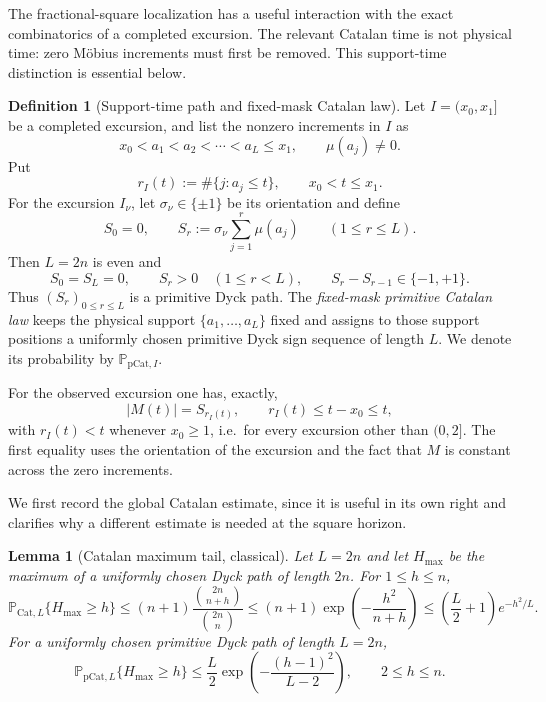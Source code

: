 \documentclass[11pt,reqno]{amsart}
\numberwithin{equation}{section}
\theoremstyle{plain}
\newtheorem{lemma}[theorem]{Lemma}
\theoremstyle{definition}
\newtheorem{definition}[theorem]{Definition}
\theoremstyle{remark}
\begin{document}
The fractional-square localization has a useful interaction with the exact
combinatorics of a completed excursion.  The relevant Catalan time is not
physical time: zero M\"obius increments must first be removed.  This
support-time distinction is essential below.

\begin{definition}[Support-time path and fixed-mask Catalan law]
\label{def:support-catalan}
Let $I=(x_0,x_1]$ be a completed excursion, and list the nonzero increments in
$I$ as
\begin{equation}
 x_0<a_1<a_2<\cdots<a_L\le x_1,
 \qquad \mu(a_j)\ne0.
\end{equation}
Put
\begin{equation}
 r_I(t):=\#\{j:a_j\le t\},\qquad x_0<t\le x_1.
\end{equation}
For the excursion $I_\nu$, let $\sigma_\nu\in\{\pm1\}$ be its orientation and define
\begin{equation}
 S_0=0,\qquad
 S_r:=\sigma_\nu\sum_{j=1}^r\mu(a_j)\qquad(1\le r\le L).
\end{equation}
Then $L=2n$ is even and
\begin{equation}
 S_0=S_L=0,\qquad S_r>0\quad(1\le r<L),\qquad
 S_r-S_{r-1}\in\{-1,+1\}.
\end{equation}
Thus $(S_r)_{0\le r\le L}$ is a primitive Dyck path.  The
\emph{fixed-mask primitive Catalan law} keeps the physical support
$\{a_1,\dots,a_L\}$ fixed and assigns to those support positions a uniformly
chosen primitive Dyck sign sequence of length $L$.  We denote its probability
by $\mathbb P_{\mathrm{pCat},I}$.
\end{definition}

For the observed excursion one has, exactly,
\begin{equation}
\label{eq:support-time-height}
 |M(t)|=S_{r_I(t)},
 \qquad
 r_I(t)\le t-x_0\le t,
\end{equation}
with $r_I(t)<t$ whenever $x_0\ge1$, i.e.\ for every excursion other than $(0,2]$.
The first equality uses the orientation of the excursion and the fact that
$M$ is constant across the zero increments.

We first record the global Catalan estimate, since it is useful in its own
right and clarifies why a different estimate is needed at the square
horizon.

\begin{lemma}[Catalan maximum tail, classical]
\label{lem:catalan-max-tail}
Let $L=2n$ and let $H_{\max}$ be the maximum of a uniformly chosen Dyck path
of length $2n$.  For $1\le h\le n$,
\begin{equation}
\label{eq:catalan-max-tail}
 \mathbb P_{\mathrm{Cat},L}\{H_{\max}\ge h\}
 \le (n+1)\frac{\binom{2n}{n+h}}{\binom{2n}{n}}
 \le (n+1)\exp\!\left(-\frac{h^2}{n+h}\right)
 \le \left(\frac L2+1\right)e^{-h^2/L}.
\end{equation}
For a uniformly chosen primitive Dyck path of length $L=2n$,
\begin{equation}
\label{eq:primitive-catalan-max-tail}
 \mathbb P_{\mathrm{pCat},L}\{H_{\max}\ge h\}
 \le \frac L2\exp\!\left(-\frac{(h-1)^2}{L-2}\right),
 \qquad 2\le h\le n.
\end{equation}
\end{lemma}
\end{document}
